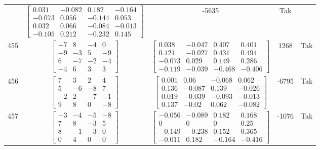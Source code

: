 \documentclass[a4paper,12pt]{article}
\begin{document}
\begin{tabular}{c c c c c}
&
$\begin{bmatrix} 0.031 & -0.082 & 0.182 & -0.164 \\ -0.073 & 0.056 & -0.144 & 0.053 \\ 0.032 & 0.066 & -0.084 & -0.013 \\ -0.105 & 0.212 & -0.232 & 0.145 \end{bmatrix}$
&
-5635
&
Tak
\\
455
&
$\begin{bmatrix} -7 & 8 & -4 & 0 \\ -9 & -3 & 5 & -9 \\ 6 & -7 & -2 & -4 \\ -4 & 6 & 3 & 3 \end{bmatrix}$
&
$\begin{bmatrix} 0.038 & -0.047 & 0.407 & 0.401 \\ 0.121 & -0.027 & 0.431 & 0.494 \\ -0.073 & 0.029 & 0.149 & 0.286 \\ -0.119 & -0.039 & -0.468 & -0.406 \end{bmatrix}$
&
1268
&
Tak
\\
456
&
$\begin{bmatrix} 7 & 3 & 2 & 4 \\ 5 & -6 & -8 & 7 \\ -2 & 2 & -7 & -1 \\ 9 & 8 & 0 & -8 \end{bmatrix}$
&
$\begin{bmatrix} 0.001 & 0.06 & -0.068 & 0.062 \\ 0.136 & -0.087 & 0.139 & -0.026 \\ 0.019 & -0.039 & -0.093 & -0.013 \\ 0.137 & -0.02 & 0.062 & -0.082 \end{bmatrix}$
&
-6795
&
Tak
\\
457
&
$\begin{bmatrix} -3 & -4 & -5 & -8 \\ 7 & 8 & -3 & 5 \\ 8 & -1 & -3 & 0 \\ 0 & 4 & 0 & 0 \end{bmatrix}$
&
$\begin{bmatrix} -0.056 & -0.089 & 0.182 & 0.168 \\ 0 & 0 & 0 & 0.25 \\ -0.149 & -0.238 & 0.152 & 0.365 \\ -0.011 & 0.182 & -0.164 & -0.416 \end{bmatrix}$
&
-1076
&
Tak
\\

\end{tabular}
\end{document}
